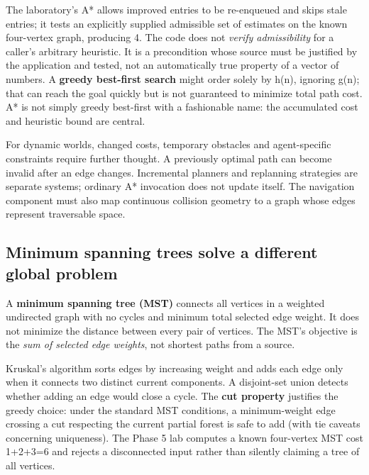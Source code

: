The laboratory's A* allows improved entries to be re-enqueued and skips stale entries; it tests an explicitly supplied admissible set of estimates on the known four-vertex graph, producing 4. The code does not \emph{verify admissibility} for a caller's arbitrary heuristic. It is a precondition whose source must be justified by the application and tested, not an automatically true property of a vector of numbers. A \textbf{greedy best-first search} might order solely by h(n), ignoring g(n); that can reach the goal quickly but is not guaranteed to minimize total path cost. A* is not simply greedy best-first with a fashionable name: the accumulated cost and heuristic bound are central.

For dynamic worlds, changed costs, temporary obstacles and agent-specific constraints require further thought. A previously optimal path can become invalid after an edge changes. Incremental planners and replanning strategies are separate systems; ordinary A* invocation does not update itself. The navigation component must also map continuous collision geometry to a graph whose edges represent traversable space.

\subsection{Minimum spanning trees solve a different global problem}\label{05-engine-i-ch008-minimum-spanning-trees-solve-a-different-global-problem}

\hypertarget{05-engine-i-ch008-minimum-spanning-trees-solve-a-different-global-problem}{}

A \textbf{minimum spanning tree (MST)} connects all vertices in a weighted undirected graph with no cycles and minimum total selected edge weight. It does not minimize the distance between every pair of vertices. The MST's objective is the \emph{sum of selected edge weights}, not shortest paths from a source.

Kruskal's algorithm sorts edges by increasing weight and adds each edge only when it connects two distinct current components. A disjoint-set union detects whether adding an edge would close a cycle. The \textbf{cut property} justifies the greedy choice: under the standard MST conditions, a minimum-weight edge crossing a cut respecting the current partial forest is safe to add (with tie caveats concerning uniqueness). The Phase 5 lab computes a known four-vertex MST cost 1+2+3=6 and rejects a disconnected input rather than silently claiming a tree of all vertices.

